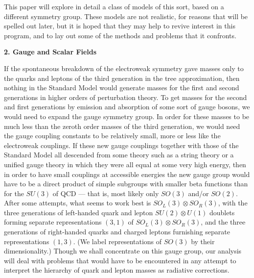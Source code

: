 This paper will explore in detail a class of models of this sort, based on a different symmetry group.  These models are not realistic, for reasons that will be spelled out later,  but it is hoped that they may help to revive interest in this program, and to lay out some of the methods and problems that it confronts.

\begin{center}
{\bf 2. Gauge and Scalar Fields}
\end{center}


If the spontaneous breakdown of the electroweak symmetry gave masses only to the quarks and leptons of the third generation  in the tree approximation, then nothing in the Standard Model would generate masses for  the first and second generations in higher orders of perturbation theory.  To get masses for the second and first generations by emission and absorption of some sort of gauge bosons,  we would need to expand the gauge symmetry group.  In order for these masses to be much less than the zeroth order masses of the third generation, we would need the gauge coupling constants to be relatively small, more or less like the electroweak couplings.  If these new gauge couplings together  with those of the Standard Model all descended from some theory such as a string theory or a unified gauge theory in which they were all equal at some very high energy, then in order to have small couplings at accessible energies the new gauge group would have to be a direct product of simple subgroups with smaller beta functions than for the $SU(3)$ of QCD --- that is, most likely only $SO(3)$ and/or $SO(2)$.  After some attempts, what seems to work best is $SO_L(3)\otimes  SO_R(3)$, with the three generations of left-handed quark and lepton $SU(2)\otimes U(1)$  doublets forming  separate representations $(3,1)$ of $SO_L(3)\otimes  SO_R(3)$, and the three generations of right-handed quarks and charged leptons furnishing separate representations   $(1,3)$.  (We label representations of $SO(3)$ by their dimensionality.)  Though we shall concentrate on this gauge group, our analysis will deal with problems that would have to be encountered in any attempt to interpret the hierarchy of quark and lepton masses as radiative corrections.

